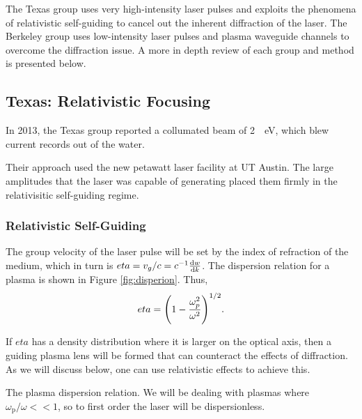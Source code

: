\documentclass[12pt,letter]{article}
\renewcommand{\footnotesize}{\scriptsize}
\begin{document}
The Texas group uses very high-intensity laser pulses and exploits the
phenomena of relativistic self-guiding to cancel out the inherent diffraction
of the laser. The Berkeley group uses low-intensity laser pulses and plasma waveguide channels to overcome the diffraction issue. A more in depth review of
each group and method is presented below.

\subsection{Texas: Relativistic Focusing}

In 2013, the Texas group reported a collumated beam of \SI{2}{\giga
\electronvolt}, which blew current records out of the
water\cite{Wang2013}.

Their approach used the new petawatt laser facility at UT Austin. The large
amplitudes that the laser was capable of generating placed them firmly in the
relativisitic self-guiding regime.

\subsubsection{Relativistic Self-Guiding}
The group velocity of the laser pulse will be set by the index of refraction of
the medium, which in turn is $eta = v_g/c = c^{-1}\dv{w}{k}$.  The dispersion
relation for a plasma is shown in Figure \ref{fig:disperion}. Thus,
\begin{equation}
    \label{eq:index}
    eta = \qty(1-\frac{\omega_p^2}{\omega^2})^{1/2}.
\end{equation}

If $eta$ has a density distribution where it is larger on the optical axis, then
a guiding plasma lens will be formed that can counteract the effects of
diffraction. As we will discuss below, one can use relativistic effects to
achieve this. 
\begin{marginfigure}
    \caption{\label{fig:dispersion}The plasma dispersion relation. We will be
        dealing with plasmas where $\omega_\mathrm{p}/\omega << 1$, so to
    first order the laser will be dispersionless. }
    \end{marginfigure}
\end{document}
